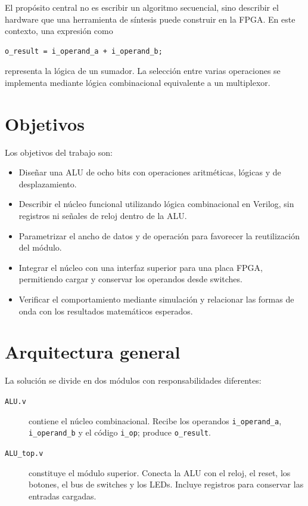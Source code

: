 \documentclass[11pt,a4paper]{article}
\newcommand{\verilog}[1]{\texttt{#1}}
\begin{document}
El propósito central no es escribir un algoritmo secuencial, sino describir el
hardware que una herramienta de síntesis puede construir en la FPGA. En este
contexto, una expresión como

\begin{lstlisting}[numbers=none]
o_result = i_operand_a + i_operand_b;
\end{lstlisting}

representa la lógica de un sumador. La selección entre varias operaciones se
implementa mediante lógica combinacional equivalente a un multiplexor.

\section{Objetivos}

Los objetivos del trabajo son:

\begin{itemize}
  \item Diseñar una ALU de ocho bits con operaciones aritméticas, lógicas y de
        desplazamiento.
  \item Describir el núcleo funcional utilizando lógica combinacional en
        Verilog, sin registros ni señales de reloj dentro de la ALU.
  \item Parametrizar el ancho de datos y de operación para favorecer la
        reutilización del módulo.
  \item Integrar el núcleo con una interfaz superior para una placa FPGA,
        permitiendo cargar y conservar los operandos desde switches.
  \item Verificar el comportamiento mediante simulación y relacionar las
        formas de onda con los resultados matemáticos esperados.
\end{itemize}

\section{Arquitectura general}

La solución se divide en dos módulos con responsabilidades diferentes:

\begin{description}
  \item[\verilog{ALU.v}] contiene el núcleo combinacional. Recibe los operandos
        \verilog{i\_operand\_a}, \verilog{i\_operand\_b} y el código \verilog{i\_op};
        produce \verilog{o\_result}.
  \item[\verilog{ALU\_top.v}] constituye el módulo superior. Conecta la ALU
        con el reloj, el reset, los botones, el bus de switches y los LEDs.
        Incluye registros para conservar las entradas cargadas.
\end{description}
\end{document}
